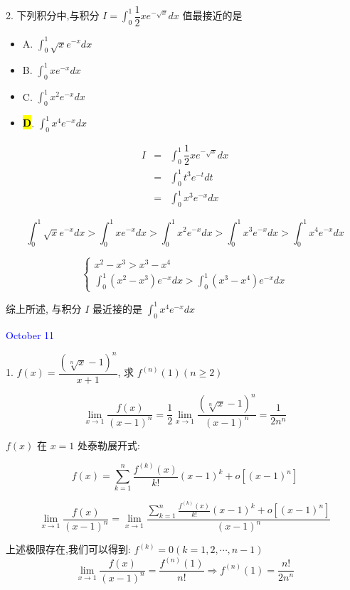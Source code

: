 2. 下列积分中,与积分 $\displaystyle{I=\int_{0}^{1}\dfrac{1}{2}xe^{-\sqrt{x}}dx}$ 值最接近的是
\begin{itemize}
	\item A. $\int_{0}^{1}\sqrt{x}e^{-x}dx$
	\item B. $\int_{0}^{1}xe^{-x}dx$
	\item C. $\int_{0}^{1}x^2e^{-x}dx$
	\item \hl{\textbf{D}}. $\int_{0}^{1}x^4e^{-x}dx$
\end{itemize}

\begin{solution}
	\begin{eqnarray*}
		I & = & \int_{0}^{1}\dfrac{1}{2}xe^{-\sqrt{x}}dx\\
		  & = & \int_{0}^{1}t^3e^{-t}dt\\
		  & = & \int_{0}^{1}x^3e^{-x}dx
	\end{eqnarray*}
	  
	$$\int_{0}^{1}\sqrt{x}e^{-x}dx>\int_{0}^{1}xe^{-x}dx>\int_{0}^{1}x^{2}e^{-x}dx>\int_{0}^{1}x^{3}e^{-x}dx>\int_{0}^{1}x^{4}e^{-x}dx$$
	
	$$\begin{cases}
		x^{2} - x^{3} > x^{3} - x^{4}\\
		\displaystyle{\int_{0}^{1}(x^{2}-x^{3})e^{-x}dx > \int_{0}^{1}(x^{3}-x^{4})e^{-x}dx}
	\end{cases}$$
	
	综上所述, 与积分 $I$ 最近接的是 $\displaystyle{\int_{0}^{1}x^{4}e^{-x}dx}$
\end{solution}


\textcolor{blue}{October 11}

1. $f(x)=\dfrac{\left(\sqrt[n]{x}-1\right) ^n}{x+1}$, 求 $f^{(n)}(1)(n\geq 2)$

\begin{solution}

	$$\lim\limits_{x\to 1}\dfrac{f(x)}{(x-1)^n}=\dfrac{1}{2}\lim\limits_{x\to 1}\dfrac{(\sqrt[n]{x}-1)^n}{(x-1)^n}=\dfrac{1}{2n^{n}}$$
	
	$f(x)$ 在 $x = 1$ 处泰勒展开式:

	$$f(x) = \sum\limits_{k=1}^{n}\dfrac{f^{(k)}(x)}{k!}(x-1)^{k} + o[(x-1)^{n}]$$ 

	$$\lim\limits_{x\to 1}\dfrac{f(x)}{(x-1)^n}=\lim\limits_{x\to 1}\dfrac{\sum\limits_{k=1}^{n}\frac{f^{(k)}(x)}{k!}(x-1)^k+o[(x-1)^n]}{(x-1)^n}$$
	
	上述极限存在,我们可以得到:  $f^{(k)}=0(k=1,2,\cdots,n-1)$
	$$\lim\limits_{x\to 1}\dfrac{f(x)}{(x-1)^n}=\dfrac{f^{(n)}(1)}{n!}\Rightarrow f^{(n)}(1)=\dfrac{n!}{2n^{n}}$$
\end{solution}


